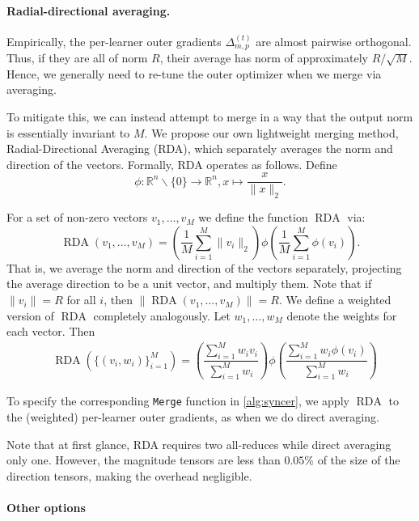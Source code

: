 \documentclass[11pt, a4paper, twocolumn, copyright, google]{google}
\newcommand{\mergefn}{\texttt{Merge}\xspace}
\DeclareMathOperator{\rda}{RDA}
\begin{document}
\paragraph{Radial-directional averaging.} Empirically, the per-learner outer gradients $\Delta_{m, p}^{(t)}$ are almost pairwise orthogonal. Thus, if they are all of norm $R$, their average has norm of approximately $R/\sqrt{M}$. Hence, we generally need to re-tune the outer optimizer when we merge via averaging.

To mitigate this, we can instead attempt to merge in a way that the output norm is essentially invariant to $M$. We propose our own lightweight merging method, Radial-Directional Averaging (RDA), which separately averages the norm and direction of the vectors. Formally, RDA operates as follows. Define
\[
\phi: \mathbb{R}^n\backslash\{0\} \to \mathbb{R}^n, x \mapsto \dfrac{x}{\|x\|_2}.
\]

For a set of non-zero vectors $v_1, \dots, v_M$ we define the function $\rda$ via:
\[
\rda(v_1, \dots, v_M) = \left(\dfrac{1}{M}\sum_{i=1}^M \|v_i\|_2 \right) \phi\left(\dfrac{1}{M}\sum_{i=1}^M \phi(v_i) \right).
\]
That is, we average the norm and direction of the vectors separately, projecting the average direction to be a unit vector, and multiply them. Note that if $\|v_i\| = R$ for all $i$, then $\|\rda(v_1, \dots, v_M)\| = R$. We define a weighted version of $\rda$ completely analogously. Let $w_1, \dots, w_M$ denote the weights for each vector. Then
\begin{align*}
& \rda\left(\{(v_i, w_i)\}_{i=1}^M\right) = \left(\dfrac{\sum_{i=1}^M w_iv_i}{\sum_{i=1}^M w_i}\right) \phi\left(\dfrac{\sum_{i=1}^M w_i \phi(v_i)}{\sum_{i=1}^M w_i} \right)
\end{align*}

To specify the corresponding \mergefn function in \ref{alg:syncer}, we apply $\rda$ to the (weighted) per-learner outer gradients, as when we do direct averaging.

Note that at first glance, RDA requires two all-reduces while direct averaging only one. However, the magnitude tensors are less than $0.05\%$ of the size of the direction tensors, making the overhead negligible.

\paragraph{Other options}
\end{document}
